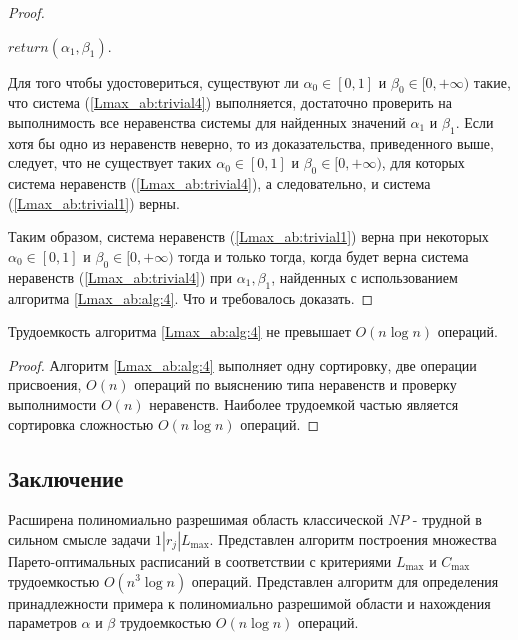 \begin{proof}
\begin{algorithm}[H]
\For{($i = 1, i<n, i++$)}{
    \If{$\alpha_1 P_i + \beta_1 R_i < D_i$}{
        $return$\textit{(Не существует $\alpha \in [0,1]$ и $\beta \in [0, +\infty)$, для которых система (\ref{Lmax_ab:trivial1}) верна.);}\\
    }
}
$return(\alpha_1, \beta_1)$.\\
\end{algorithm}
\normalsize

Для того чтобы удостовериться, существуют ли $\alpha_0 \in [0,1]$ и $\beta_0 \in [0, +\infty)$ такие, что система (\ref{Lmax_ab:trivial4}) выполняется,
достаточно проверить на выполнимость все неравенства системы для найденных значений $\alpha_1$ и $\beta_1$. Если хотя бы одно из неравенств неверно, то
из доказательства, приведенного выше, следует, что не существует таких $\alpha_0 \in [0,1]$ и $\beta_0 \in [0, +\infty)$, для которых система неравенств (\ref{Lmax_ab:trivial4}), а следовательно, и система (\ref{Lmax_ab:trivial1}) верны.

Таким образом, система неравенств (\ref{Lmax_ab:trivial1}) верна при некоторых $\alpha_0 \in [0,1]$ и $\beta_0 \in [0, +\infty)$ тогда и только тогда, когда будет верна система неравенств (\ref{Lmax_ab:trivial4}) при $\alpha_1, \beta_1$, найденных с использованием алгоритма \ref{Lmax_ab:alg:4}. Что и требовалось доказать.
\end{proof}

\begin{lemma}\label{Lmax_ab:lm:6}
Трудоемкость алгоритма \ref{Lmax_ab:alg:4} не превышает $O(n \log n)$ операций.
\end{lemma}
\begin{proof}
Алгоритм \ref{Lmax_ab:alg:4} выполняет одну сортировку, две операции присвоения, $O(n)$ операций по выяснению типа неравенств и проверку выполнимости $O(n)$ неравенств. Наиболее трудоемкой частью является сортировка сложностью $O(n \log n)$ операций.
\end{proof}

\subsection{Заключение}
Расширена полиномиально разрешимая область классической $NP$ - трудной в сильном смысле задачи $1|r_j|L_{\max}$. Представлен алгоритм построения множества Парето-оптимальных расписаний в соответствии с критериями $L_{\max}$ и $C_{\max}$ трудоемкостью $O(n^3 \log n)$ операций. Представлен алгоритм для определения принадлежности примера к полиномиально разрешимой области и нахождения параметров $\alpha$ и $\beta$ трудоемкостью $O(n \log n)$ операций.
